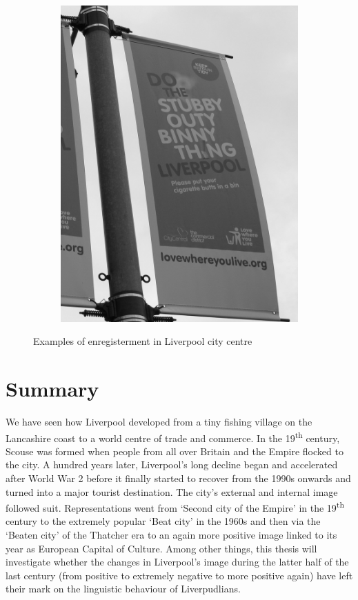 \begin{figure}[h]
\begin{subfigure}[h]{0.45\textwidth}
				\includegraphics[width=\textwidth]{figures/stubby}
			\end{subfigure}
		\caption{Examples of enregisterment in Liverpool city centre}
		\label{fig.posters}
	\end{figure}

\section{Summary}\label{sec.hist.con}

We have seen how Liverpool developed from a tiny fishing village on the Lancashire coast to a world centre of trade and commerce.
In the 19\textsuperscript{th} century, Scouse was formed when people from all over Britain and the Empire flocked to the city.
A hundred years later, Liverpool's long decline began and accelerated after World War 2 before it finally started to recover from the 1990s onwards and turned into a major tourist destination.
The city's external and internal image followed suit.
Representations went from `Second city of the Empire' in the 19\textsuperscript{th} century to the extremely popular `Beat city' in the 1960s and then via the `Beaten city' of the Thatcher era to an again more positive image linked to its year as European Capital of Culture.
Among other things, this thesis will investigate whether the changes in Liverpool's image during the latter half of the last century (from positive to extremely negative to more positive again) have left their mark on the linguistic behaviour of Liverpudlians.